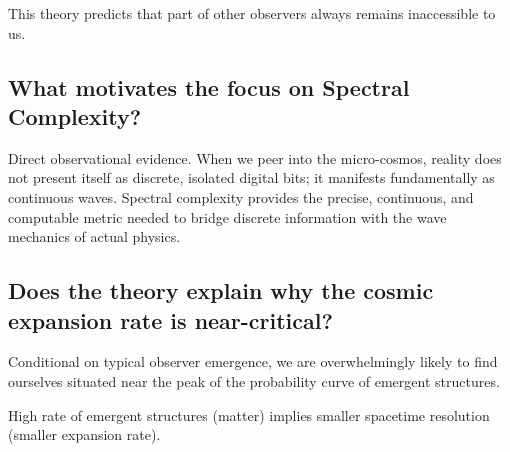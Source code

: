 This theory predicts that part of other observers always remains inaccessible to us. 


\subsection*{What motivates the focus on Spectral Complexity?}

Direct observational evidence. When we peer into the micro-cosmos, reality does not present itself as discrete, isolated digital bits;
it manifests fundamentally as continuous waves.
Spectral complexity provides the precise, continuous, and computable metric needed to bridge discrete information with the wave mechanics of actual physics.


\subsection*{Does the theory explain why the cosmic expansion rate is near-critical?}

Conditional on typical observer emergence, we are overwhelmingly likely to find ourselves situated near the peak of the probability curve of emergent structures. 

High rate of emergent structures (matter) implies smaller spacetime resolution (smaller expansion rate). 

